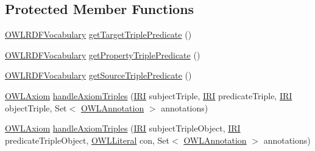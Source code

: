 \subsection*{Protected Member Functions}
\begin{DoxyCompactItemize}
\item 
\hyperlink{enumorg_1_1semanticweb_1_1owlapi_1_1vocab_1_1_o_w_l_r_d_f_vocabulary}{O\-W\-L\-R\-D\-F\-Vocabulary} \hyperlink{classorg_1_1coode_1_1owlapi_1_1rdfxml_1_1parser_1_1_type_axiom_handler_a5dafb39d1043e32ce35eeeef736270b0}{get\-Target\-Triple\-Predicate} ()
\item 
\hyperlink{enumorg_1_1semanticweb_1_1owlapi_1_1vocab_1_1_o_w_l_r_d_f_vocabulary}{O\-W\-L\-R\-D\-F\-Vocabulary} \hyperlink{classorg_1_1coode_1_1owlapi_1_1rdfxml_1_1parser_1_1_type_axiom_handler_a8a5b6d7115a9e5e6a5c07fe16f2e24b7}{get\-Property\-Triple\-Predicate} ()
\item 
\hyperlink{enumorg_1_1semanticweb_1_1owlapi_1_1vocab_1_1_o_w_l_r_d_f_vocabulary}{O\-W\-L\-R\-D\-F\-Vocabulary} \hyperlink{classorg_1_1coode_1_1owlapi_1_1rdfxml_1_1parser_1_1_type_axiom_handler_a5af3b9e3b0424193f30bec282e7bac9a}{get\-Source\-Triple\-Predicate} ()
\item 
\hyperlink{interfaceorg_1_1semanticweb_1_1owlapi_1_1model_1_1_o_w_l_axiom}{O\-W\-L\-Axiom} \hyperlink{classorg_1_1coode_1_1owlapi_1_1rdfxml_1_1parser_1_1_type_axiom_handler_a9a4b14f89a4d142c8bae2ce97f35ab22}{handle\-Axiom\-Triples} (\hyperlink{classorg_1_1semanticweb_1_1owlapi_1_1model_1_1_i_r_i}{I\-R\-I} subject\-Triple, \hyperlink{classorg_1_1semanticweb_1_1owlapi_1_1model_1_1_i_r_i}{I\-R\-I} predicate\-Triple, \hyperlink{classorg_1_1semanticweb_1_1owlapi_1_1model_1_1_i_r_i}{I\-R\-I} object\-Triple, Set$<$ \hyperlink{interfaceorg_1_1semanticweb_1_1owlapi_1_1model_1_1_o_w_l_annotation}{O\-W\-L\-Annotation} $>$ annotations)
\item 
\hyperlink{interfaceorg_1_1semanticweb_1_1owlapi_1_1model_1_1_o_w_l_axiom}{O\-W\-L\-Axiom} \hyperlink{classorg_1_1coode_1_1owlapi_1_1rdfxml_1_1parser_1_1_type_axiom_handler_a933714e1866b6e7a9edbacda478c0589}{handle\-Axiom\-Triples} (\hyperlink{classorg_1_1semanticweb_1_1owlapi_1_1model_1_1_i_r_i}{I\-R\-I} subject\-Triple\-Object, \hyperlink{classorg_1_1semanticweb_1_1owlapi_1_1model_1_1_i_r_i}{I\-R\-I} predicate\-Triple\-Object, \hyperlink{interfaceorg_1_1semanticweb_1_1owlapi_1_1model_1_1_o_w_l_literal}{O\-W\-L\-Literal} con, Set$<$ \hyperlink{interfaceorg_1_1semanticweb_1_1owlapi_1_1model_1_1_o_w_l_annotation}{O\-W\-L\-Annotation} $>$ annotations)
\end{DoxyCompactItemize}
